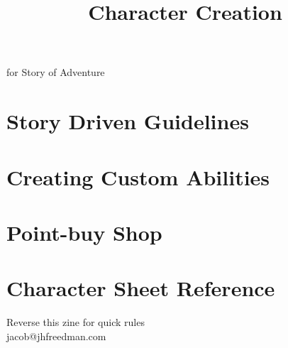 \documentclass[statementpaper,oneside,article,14pt]{memoir}
\newcommand{\BackgroundPic}[1]{%
	\put(0,0){%
		\parbox[b][\paperheight]{\paperwidth}{%
			\vfill
			\centering
			{\transparent{0.4} \texttt{[image: \#1]}}%
			\vfill
}}}
\begin{document}
	
	
	
	
	\title{Character Creation}
	\date{}
	\begingroup
	\let\cleardoublepage\clearpage
	
	
	\begin{titlingpage}
		\maketitle
		
		for Story of Adventure
		
	\end{titlingpage}
	
	\endgroup
	
	\pagestyle{empty}
	
	
	
	\section*{Story Driven Guidelines}
	
	\section*{Creating Custom Abilities}
	
	\section*{Point-buy Shop}
	
	\section*{Character Sheet Reference}
	
	
	
	\newpage
	
	Reverse this zine for quick rules
	\\jacob@jhfreedman.com
	
\end{document}
